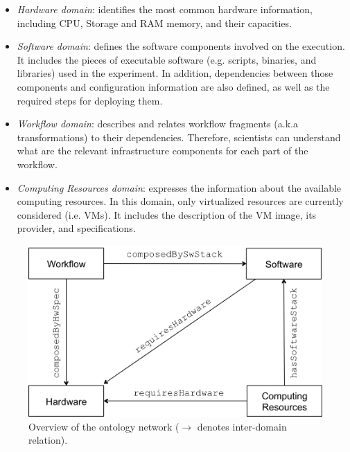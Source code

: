 \begin{itemize}
	\setlength{\itemsep}{1pt}
    \setlength{\parskip}{0pt}
    \setlength{\parsep}{0pt}

	\item{\emph{Hardware domain}}: identifies the most common hardware information, including CPU, Storage and RAM memory, and their capacities.
	
    \item{\emph{Software domain}}: defines the software components involved on the execution. It includes the pieces of executable software (e.g. scripts, binaries, and libraries) used in the experiment. In addition, dependencies between those components and configuration information are also defined, as well as the required steps for deploying them.
	
    \item{\emph{Workflow domain}}: describes and relates workflow fragments (a.k.a transformations) to their dependencies. Therefore, scientists can understand what are the relevant infrastructure components for each part of the workflow.
	
    \item{\emph{Computing Resources domain}}: expresses the information about the available computing resources. In this domain, only virtualized resources are currently considered (i.e. VMs). It includes the description of the VM image, its provider, and specifications.
\end{itemize}

\begin{figure}[!htb]
	\centering
    \includegraphics[width=.9\linewidth]{figures/wicusrels}
    \caption{Overview of the ontology network ($\rightarrow$ denotes inter-domain relation).}
    \label{fig:wicusrels}
\end{figure}
